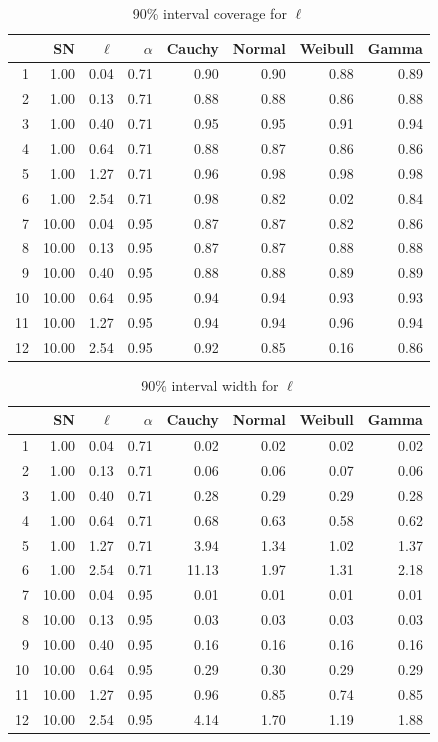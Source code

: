 \documentclass{article}
\begin{document}
\begin{table}[htbp]
\centering
\caption {90\% interval coverage for $\ell$} \label{90_cover_ell} 
\begin{tabular}{rrrrrrrr}
  \hline
 & SN & $\ell$ & $\alpha$ & Cauchy & Normal & Weibull & Gamma \\ 
  \hline
1 & 1.00 & 0.04 & 0.71 & 0.90 & 0.90 & 0.88 & 0.89 \\ 
  2 & 1.00 & 0.13 & 0.71 & 0.88 & 0.88 & 0.86 & 0.88 \\ 
  3 & 1.00 & 0.40 & 0.71 & 0.95 & 0.95 & 0.91 & 0.94 \\ 
  4 & 1.00 & 0.64 & 0.71 & 0.88 & 0.87 & 0.86 & 0.86 \\ 
  5 & 1.00 & 1.27 & 0.71 & 0.96 & 0.98 & 0.98 & 0.98 \\ 
  6 & 1.00 & 2.54 & 0.71 & 0.98 & 0.82 & 0.02 & 0.84 \\ 
  7 & 10.00 & 0.04 & 0.95 & 0.87 & 0.87 & 0.82 & 0.86 \\ 
  8 & 10.00 & 0.13 & 0.95 & 0.87 & 0.87 & 0.88 & 0.88 \\ 
  9 & 10.00 & 0.40 & 0.95 & 0.88 & 0.88 & 0.89 & 0.89 \\ 
  10 & 10.00 & 0.64 & 0.95 & 0.94 & 0.94 & 0.93 & 0.93 \\ 
  11 & 10.00 & 1.27 & 0.95 & 0.94 & 0.94 & 0.96 & 0.94 \\ 
  12 & 10.00 & 2.54 & 0.95 & 0.92 & 0.85 & 0.16 & 0.86 \\ 
   \hline
\end{tabular}
\end{table}

\begin{table}[htbp]
\centering
\caption {90\% interval width for $\ell$} \label{90_wid_ell} 
\begin{tabular}{rrrrrrrr}
  \hline
 & SN & $\ell$ & $\alpha$ & Cauchy & Normal & Weibull & Gamma \\ 
  \hline
1 & 1.00 & 0.04 & 0.71 & 0.02 & 0.02 & 0.02 & 0.02 \\ 
  2 & 1.00 & 0.13 & 0.71 & 0.06 & 0.06 & 0.07 & 0.06 \\ 
  3 & 1.00 & 0.40 & 0.71 & 0.28 & 0.29 & 0.29 & 0.28 \\ 
  4 & 1.00 & 0.64 & 0.71 & 0.68 & 0.63 & 0.58 & 0.62 \\ 
  5 & 1.00 & 1.27 & 0.71 & 3.94 & 1.34 & 1.02 & 1.37 \\ 
  6 & 1.00 & 2.54 & 0.71 & 11.13 & 1.97 & 1.31 & 2.18 \\ 
  7 & 10.00 & 0.04 & 0.95 & 0.01 & 0.01 & 0.01 & 0.01 \\ 
  8 & 10.00 & 0.13 & 0.95 & 0.03 & 0.03 & 0.03 & 0.03 \\ 
  9 & 10.00 & 0.40 & 0.95 & 0.16 & 0.16 & 0.16 & 0.16 \\ 
  10 & 10.00 & 0.64 & 0.95 & 0.29 & 0.30 & 0.29 & 0.29 \\ 
  11 & 10.00 & 1.27 & 0.95 & 0.96 & 0.85 & 0.74 & 0.85 \\ 
  12 & 10.00 & 2.54 & 0.95 & 4.14 & 1.70 & 1.19 & 1.88 \\ 
   \hline
\end{tabular}
\end{table}
\end{document}

